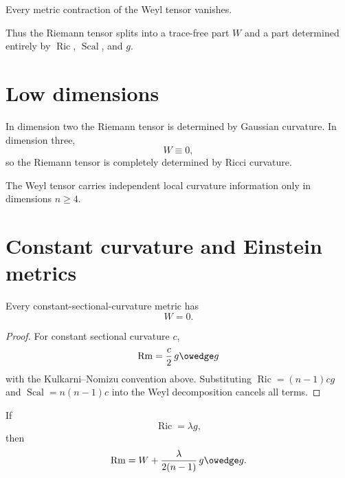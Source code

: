 \begin{theorem}\label{thm:vii28-tracefree}
Every metric contraction of the Weyl tensor vanishes.
\end{theorem}

\begin{remark}
Thus the Riemann tensor splits into a trace-free part \(W\) and a part determined
entirely by \(\operatorname{Ric}\), \(\operatorname{Scal}\), and \(g\).
\end{remark}

\section{Low dimensions}

\begin{theorem}\label{thm:vii28-lowdim}
In dimension two the Riemann tensor is determined by Gaussian curvature.  In
dimension three,
\[
W\equiv0,
\]
so the Riemann tensor is completely determined by Ricci curvature.
\end{theorem}

\begin{warning}\label{warn:vii28-dim}
The Weyl tensor carries independent local curvature information only in dimensions
\(n\ge4\).
\end{warning}

\section{Constant curvature and Einstein metrics}

\begin{proposition}\label{prop:vii28-spaceform}
Every constant-sectional-curvature metric has
\[
W=0.
\]
\end{proposition}

\begin{proof}
For constant sectional curvature \(c\),
\[
\operatorname{Rm}
=
\frac c2\,g\owedge g
\]
with the Kulkarni--Nomizu convention above.  Substituting
\(\operatorname{Ric}=(n-1)cg\) and
\(\operatorname{Scal}=n(n-1)c\) into the Weyl decomposition cancels all terms.
\end{proof}

\begin{proposition}\label{prop:vii28-einstein}
If
\[
\operatorname{Ric}=\lambda g,
\]
then
\[
\operatorname{Rm}
=
W
+
\frac{\lambda}{2(n-1)}\,g\owedge g.
\]
\end{proposition}

